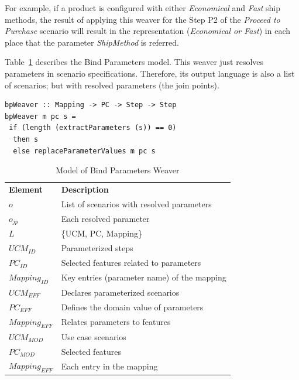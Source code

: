For example, if a product is configured with either \emph{Economical} and
\emph{Fast} ship methods, the result of applying this weaver for
the Step P2 of the \emph{Proceed to Purchase} scenario will result in the
representation (\emph{Economical or Fast}) in each place that the parameter \emph{ShipMethod} is referred.

Table~\ref{tab:bp-weaver} describes the Bind Parameters model. This weaver just resolves parameters in scenario specifications. Therefore, its output language is also a list of scenarios; but with resolved parameters (the join points).

\begin{lstlisting}[belowskip=10pt,frame=tb,caption={Bind parameter weaver function},label=lst:bind]
bpWeaver :: Mapping -> PC -> Step -> Step
bpWeaver m pc s =
 if (length (extractParameters (s)) == 0)
  then s
  else replaceParameterValues m pc s
\end{lstlisting}


\begin{table}[th]
\begin{center}
\caption{Model of Bind Parameters Weaver} \label{tab:bp-weaver}
\begin{tabular}{p{0.7in}p{2.3in}}
   \hline\noalign{\smallskip}
  {\bf Element} & {\bf Description} \\
   \noalign{\smallskip}
   \hline
   \noalign{\smallskip}
   $o$               & List of scenarios with resolved parameters  \\
   $o_{jp}$        & Each resolved parameter \\
   $L$               & \{UCM, PC, Mapping\} \\
   $UCM_{ID}$ & Parameterized steps \\
   $PC_{ID}$    & Selected features related to parameters \\
   $Mapping_{ID}$ & Key entries (parameter name) of the mapping\\
   $UCM_{EFF}$ & Declares parameterized scenarios \\
   $PC_{EFF}$    & Defines the domain value of parameters \\
   $Mapping_{EFF}$ & Relates parameters to features \\
   $UCM_{MOD}$ & Use case scenarios \\
   $PC_{MOD}$    & Selected features \\
   $Mapping_{EFF}$ & Each entry in the mapping \\
  \hline
  \end{tabular}
\end{center}
\end{table}

